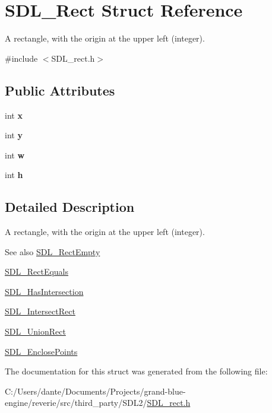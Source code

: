 \hypertarget{struct_s_d_l___rect}{}\section{S\+D\+L\+\_\+\+Rect Struct Reference}
\label{struct_s_d_l___rect}


A rectangle, with the origin at the upper left (integer).  




{\ttfamily \#include $<$S\+D\+L\+\_\+rect.\+h$>$}

\subsection*{Public Attributes}
\begin{DoxyCompactItemize}
\item 
\mbox{\label{struct_s_d_l___rect_a85418d94621dd6855805c4b5c7bf6482}} 
int {\bfseries x}
\item 
\mbox{\label{struct_s_d_l___rect_a822694af8ddca5fd0d5d94e47106ab85}} 
int {\bfseries y}
\item 
\mbox{\label{struct_s_d_l___rect_a56b7be5738fb6fab86881534a814c45e}} 
int {\bfseries w}
\item 
\mbox{\label{struct_s_d_l___rect_a0a17d46b320af8063b746153348edd72}} 
int {\bfseries h}
\end{DoxyCompactItemize}


\subsection{Detailed Description}
A rectangle, with the origin at the upper left (integer). 

\begin{DoxySeeAlso}{See also}
\mbox{\hyperlink{_s_d_l__rect_8h_aac0e9b5d3f34baec6a2cde95bb01f49c}{S\+D\+L\+\_\+\+Rect\+Empty}} 

\mbox{\hyperlink{_s_d_l__rect_8h_a156979fd3561cf90b87741d11057262a}{S\+D\+L\+\_\+\+Rect\+Equals}} 

\mbox{\hyperlink{_s_d_l__rect_8h_a191ec0b069421d4a36304b475697e847}{S\+D\+L\+\_\+\+Has\+Intersection}} 

\mbox{\hyperlink{_s_d_l__rect_8h_aff8e3dd3b1a25443cd7c8cf02a087290}{S\+D\+L\+\_\+\+Intersect\+Rect}} 

\mbox{\hyperlink{_s_d_l__rect_8h_a659f2c25335202888408c95195823f9c}{S\+D\+L\+\_\+\+Union\+Rect}} 

\mbox{\hyperlink{_s_d_l__rect_8h_afcbb58dbba760b9e6fdb4b5d1ece015c}{S\+D\+L\+\_\+\+Enclose\+Points}} 
\end{DoxySeeAlso}


The documentation for this struct was generated from the following file\+:\begin{DoxyCompactItemize}
\item 
C\+:/\+Users/dante/\+Documents/\+Projects/grand-\/blue-\/engine/reverie/src/third\+\_\+party/\+S\+D\+L2/\mbox{\hyperlink{_s_d_l__rect_8h}{S\+D\+L\+\_\+rect.\+h}}\end{DoxyCompactItemize}
